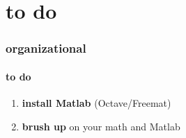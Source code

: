     \section{to do}
        \begin{frame}\frametitle{organizational}\framesubtitle{to do}
            \begin{enumerate}
            
                \smallskip
                \item<2->   \textbf{install Matlab} (Octave/Freemat)
            
                \smallskip
                \item<3->   \textbf{brush up} on your math and Matlab
            
            \end{enumerate}
        \end{frame}




